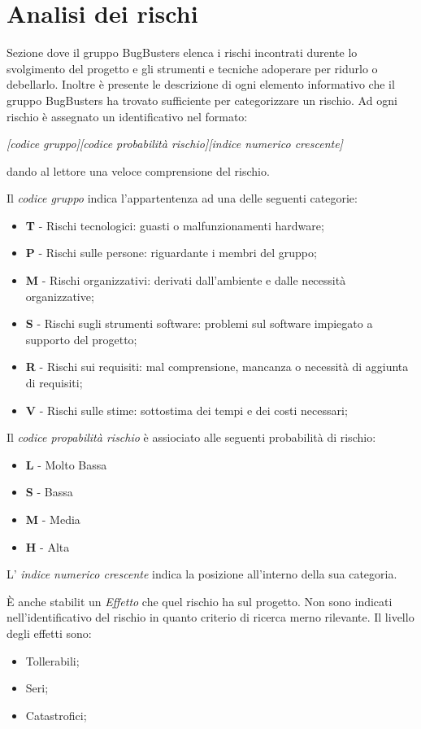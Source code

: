 \section{Analisi dei rischi}
Sezione dove il gruppo BugBusters elenca i rischi incontrati durente lo svolgimento del progetto e gli strumenti e tecniche adoperare per ridurlo o debellarlo. Inoltre \`e presente le descrizione di ogni elemento informativo che il gruppo BugBusters ha trovato sufficiente per categorizzare un rischio.
Ad ogni rischio \`e assegnato un identificativo nel formato: 

\begin{center}
\textit{[codice gruppo][codice probabilit\`a rischio][indice numerico crescente]}  
\end{center}

dando al lettore una veloce comprensione del rischio.

Il \textit{codice gruppo} indica l'appartentenza ad una delle seguenti categorie:
\begin{itemize}
\item \textbf{T} - Rischi tecnologici: guasti o malfunzionamenti hardware;
\item \textbf{P} - Rischi sulle persone: riguardante i membri del gruppo;
\item \textbf{M} - Rischi organizzativi: derivati dall'ambiente e dalle necessit\`a organizzative;
\item \textbf{S} - Rischi sugli strumenti software: problemi sul software impiegato a supporto del progetto;
\item \textbf{R} - Rischi sui requisiti: mal comprensione, mancanza o necessit\`a di aggiunta di requisiti;
\item \textbf{V} - Rischi sulle stime: sottostima dei tempi e dei costi necessari;
\end{itemize}

Il \textit{codice propabilit\`a rischio} \`e assiociato alle seguenti probabilit\`a di rischio: 
\begin{itemize}
\item \textbf{L} - Molto Bassa
\item \textbf{S} - Bassa
\item \textbf{M} - Media
\item \textbf{H} - Alta
\end{itemize}

L' \textit{indice numerico crescente} indica la posizione all'interno della sua categoria. 

\`E anche stabilit un \textit{Effetto} che quel rischio ha sul progetto. Non sono indicati nell'identificativo del rischio in quanto criterio di ricerca merno rilevante. Il livello degli effetti sono:
\begin{itemize}
\item Tollerabili;
\item Seri;
\item Catastrofici;
\end{itemize}

